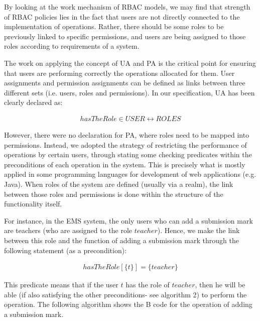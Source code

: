 By looking at the work mechanism of RBAC models, we may find that strength of RBAC policies lies in the fact that users are not directly connected to the implementation of operations. Rather, there should be some roles to be previously linked to specific permissions, and users are being assigned to those roles according to requirements of a system. 

The work on applying the concept of UA and PA is the critical point for ensuring that users are performing correctly the operations allocated for them.  User assignments and permission assignments can be defined as links between three different sets (i.e. users, roles and permissions).  In our specification, UA has been clearly declared as:
          

\begin{align*}
hasTheRole \in USER \leftrightarrow ROLES
\end{align*}


However, there were no declaration for PA, where roles need to be mapped into permissions.  Instead, we adopted the strategy of restricting the performance of operations by certain users, through stating some checking predicates within the preconditions of each operation in the system.  This is precisely what is mostly applied in some programming languages for development of web applications (e.g. Java). When roles of the system are defined (usually via a realm), the link between those roles and permissions is done within the structure of the functionality itself.  

For instance, in the EMS system, the only users who can add a submission mark are teachers (who are assigned to the role $teacher$).  Hence, we make the link between this role and the function of adding a submission mark through the following statement (as a precondition): 


\begin{align*}
hasTheRole[\{t\}] = \{teacher\} 
\end{align*}



This predicate means that if the user $t$ has the role of $teacher$, then he will be able (if also satisfying the other preconditions- see algorithm 2) to perform the operation.  The following algorithm shows the B code for the operation of adding a submission mark.

